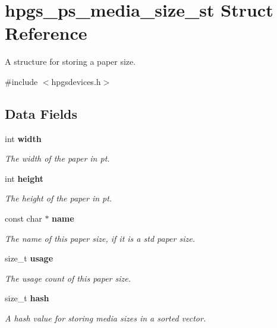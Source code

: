 \section{hpgs\_\-ps\_\-media\_\-size\_\-st Struct Reference}
\label{structhpgs__ps__media__size__st}


A structure for storing a paper size.  




{\ttfamily \#include $<$hpgsdevices.h$>$}

\subsection*{Data Fields}
\begin{DoxyCompactItemize}
\item 
int {\bf width}\label{structhpgs__ps__media__size__st_aca91814a4af3989fb51c2e58c51e523a}

\begin{DoxyCompactList}\small\item\em The width of the paper in pt. \item\end{DoxyCompactList}\item 
int {\bf height}\label{structhpgs__ps__media__size__st_a106d89beb31eb46aa807ef2c3302bc95}

\begin{DoxyCompactList}\small\item\em The height of the paper in pt. \item\end{DoxyCompactList}\item 
const char $\ast$ {\bf name}\label{structhpgs__ps__media__size__st_a3384834f44a02e470913195e64e93d5a}

\begin{DoxyCompactList}\small\item\em The name of this paper size, if it is a std paper size. \item\end{DoxyCompactList}\item 
size\_\-t {\bf usage}\label{structhpgs__ps__media__size__st_acea1bedaf8494023dc288edd3e7f5fbf}

\begin{DoxyCompactList}\small\item\em The usage count of this paper size. \item\end{DoxyCompactList}\item 
size\_\-t {\bf hash}\label{structhpgs__ps__media__size__st_a5b695a806ae47a840a649170860754b6}

\begin{DoxyCompactList}\small\item\em A hash value for storing media sizes in a sorted vector. \item\end{DoxyCompactList}\end{DoxyCompactItemize}


